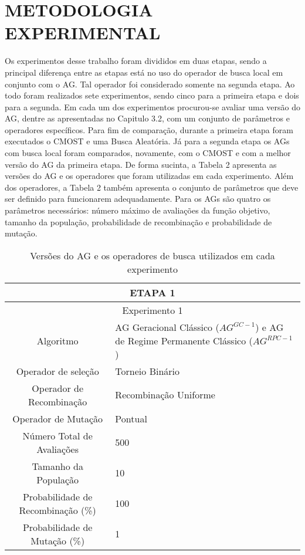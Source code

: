 \documentclass[12pt,a4paper]{report}
\begin{document}
\section{METODOLOGIA EXPERIMENTAL}

Os experimentos desse trabalho foram divididos em duas etapas, sendo a principal diferença entre as etapas está no uso do operador de busca local em conjunto com o AG. Tal operador foi considerado somente na segunda etapa. Ao todo foram realizados sete experimentos, sendo cinco para a primeira etapa e dois para a segunda. Em cada um dos experimentos procurou-se avaliar uma versão do AG, dentre as apresentadas no Capitulo 3.2, com um conjunto de parâmetros e operadores específicos. Para fim de comparação, durante a primeira etapa foram executados o CMOST e uma Busca Aleatória. Já para a segunda etapa os AGs com busca local foram comparados, novamente, com o CMOST e com a melhor versão do AG da primeira etapa. De forma sucinta, a Tabela 2 apresenta as versões do AG e os operadores que foram utilizadas em cada experimento. Além dos operadores, a Tabela 2 também apresenta o conjunto de parâmetros que deve ser definido para funcionarem adequadamente. Para os AGs são quatro os parâmetros necessários: número máximo de avaliações da função objetivo, tamanho da população, probabilidade de recombinação e probabilidade de mutação.

\begin{table}[H]
\centering
\caption{Versões do AG e os operadores de busca utilizados em cada experimento}

\begin{tabular}{|c|p{10cm}|}
\hline
 \multicolumn{2}{|c|}{ETAPA 1} \\ \hline
 \multicolumn{2}{|c|}{Experimento 1} \\ \hline
 {Algoritmo} & AG Geracional Clássico ($AG^{GC-1}$) e AG de Regime Permanente Clássico ($AG^{RPC-1}$) \\ \hline
 Operador de seleção & Torneio Binário \\ \hline
 Operador de Recombinação & Recombinação Uniforme \\  \hline
 Operador de Mutação & Pontual \\ \hline
 Número Total de Avaliações & 500 \\ \hline
 Tamanho da População & 10 \\ \hline
 Probabilidade de Recombinação (\%) & 100 \\ \hline
 Probabilidade de Mutação (\%) & 1 \\ \hline 
\end{tabular}
\end{table}
\end{document}
